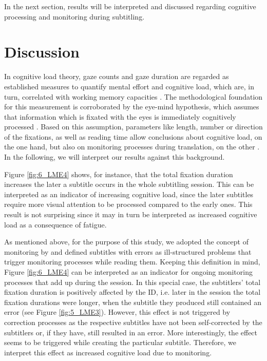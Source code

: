 \documentclass[output=paper]{langscibook}
\begin{document}
In the next section, results will be interpreted and discussed regarding cognitive processing and monitoring during subtitling.

\section{Discussion} 
In cognitive load theory, gaze counts and gaze duration are regarded as established measures to quantify mental effort and cognitive load, which are, in turn, correlated with working memory capacities \citep{buettner2013}.
The methodological foundation for this measurement is corroborated by the eye-mind hypothesis, which assumes that information which is fixated with the eyes is immediately cognitively processed \citep{just1980theory}.
Based on this assumption, parameters like length, number or direction of the fixations, as well as reading time allow conclusions about cognitive load, on the one hand, but also on monitoring processes during translation, on the other \citep{carl-dragsted2012, schaeffer-etal2019}.
In the following, we will interpret our results against this background.

Figure \ref{fig:6_LME4} shows, for instance, that the total fixation duration increases the later a subtitle occurs in the whole subtitling session.
This can be interpreted as an indicator of increasing cognitive load, since the later subtitles require more visual attention to be processed compared to the early ones.
This result is not surprising since it may in turn be interpreted as increased cognitive load as a consequence of fatigue.

As mentioned above, for the purpose of this study, we adopted the concept of monitoring by \citet{kitchener1983cognition} and defined subtitles with errors as ill-structured problems that trigger monitoring processes while reading them.
Keeping this definition in mind, Figure \ref{fig:6_LME4} can be interpreted as an indicator for ongoing monitoring processes that add up during the session.
In this special case, the subtitlers' total fixation duration is positively affected by the ID, i.e. later in the session the total fixation durations were longer, when the subtitle they produced still contained an error (see Figure \ref{fig:5_LME3}).
However, this effect is not triggered by correction processes as the respective subtitles have not been self-corrected by the subtitlers or, if they have, still resulted in an error.
More interestingly, the effect seems to be triggered while creating the particular subtitle.
Therefore, we interpret this effect as increased cognitive load due to monitoring.
\end{document}

